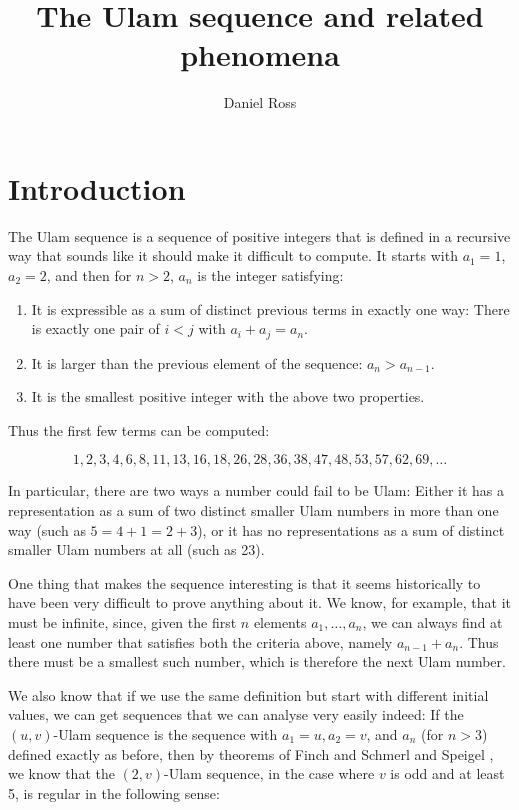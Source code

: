 \documentclass{article}
\title{The Ulam sequence and related phenomena}
\author{Daniel Ross}
\date{ }
\theoremstyle{definition}
\theoremstyle{remark}
\numberwithin{equation}{section}
\begin{document}
\maketitle

\tableofcontents

\section{Introduction}

The Ulam sequence is a sequence of positive integers that is defined
in a recursive way that sounds like it should make it difficult to
compute.  It starts with $a_1 = 1$, $a_2 = 2$, and then for $n > 2$,
$a_n$ is the integer satisfying: 
\begin{enumerate}
\item It is expressible as a sum of distinct previous terms in exactly
  one way: There is exactly one pair of $i < j$ with
  $a_i + a_j = a_n$.
\item It is larger than the previous element of the sequence: $a_n >
  a_{n-1}$.
\item It is the smallest positive integer with the above two
  properties.
\end{enumerate}

Thus the first few terms can be computed: 

\[1, 2, 3, 4, 6, 8, 11, 13, 16, 18, 26, 28, 36, 38, 47, 48, 53, 57, 62,
69, \ldots\]

In particular, there are two ways a number could fail to be Ulam:
Either it has a representation as a sum of two distinct smaller Ulam
numbers in more than one way (such as $5 = 4+1 = 2+3$), or it has no
representations as a sum of distinct smaller Ulam numbers at all (such
as 23).

One thing that makes the sequence interesting is that it seems
historically to have been very difficult to prove anything about it.
We know, for example, that it must be infinite, since, given the first
$n$ elements $a_1, \ldots, a_n$, we can always find at least one
number that satisfies both the criteria above, namely $a_{n-1} + a_n$.
Thus there must be a smallest such number, which is therefore the next
Ulam number.

We also know that if we use the same definition but start with
different initial values, we can get sequences that we can analyse
very easily indeed: If the $(u,v)$-Ulam sequence is the sequence with
$a_1 = u, a_2 = v$, and $a_n$ (for $n > 3$) defined exactly as before,
then by theorems of Finch \cite{regularity_criterion_finch} and Schmerl and Speigel \cite{regularity_schmerl}, we
know that the $(2,v)$-Ulam sequence, in the case where $v$ is odd and
at least 5, is regular in the following sense:
\end{document}

